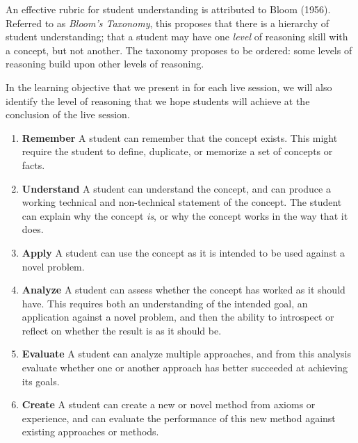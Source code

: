 \documentclass[
]{book}
\providecommand{\tightlist}{%
  \setlength{\itemsep}{0pt}\setlength{\parskip}{0pt}}
\theoremstyle{definition}
\theoremstyle{definition}
\theoremstyle{definition}
\theoremstyle{definition}
\theoremstyle{remark}
\begin{document}
An effective rubric for student understanding is attributed to Bloom (1956). Referred to as \emph{Bloom's Taxonomy}, this proposes that there is a hierarchy of student understanding; that a student may have one \emph{level} of reasoning skill with a concept, but not another. The taxonomy proposes to be ordered: some levels of reasoning build upon other levels of reasoning.

In the learning objective that we present in for each live session, we will also identify the level of reasoning that we hope students will achieve at the conclusion of the live session.

\begin{enumerate}
\def\labelenumi{\arabic{enumi}.}
\tightlist
\item
  \textbf{Remember} A student can remember that the concept exists. This might require the student to define, duplicate, or memorize a set of concepts or facts.
\item
  \textbf{Understand} A student can understand the concept, and can produce a working technical and non-technical statement of the concept. The student can explain why the concept \emph{is}, or why the concept works in the way that it does.
\item
  \textbf{Apply} A student can use the concept as it is intended to be used against a novel problem.
\item
  \textbf{Analyze} A student can assess whether the concept has worked as it should have. This requires both an understanding of the intended goal, an application against a novel problem, and then the ability to introspect or reflect on whether the result is as it should be.
\item
  \textbf{Evaluate} A student can analyze multiple approaches, and from this analysis evaluate whether one or another approach has better succeeded at achieving its goals.
\item
  \textbf{Create} A student can create a new or novel method from axioms or experience, and can evaluate the performance of this new method against existing approaches or methods.
\end{enumerate}
\end{document}
